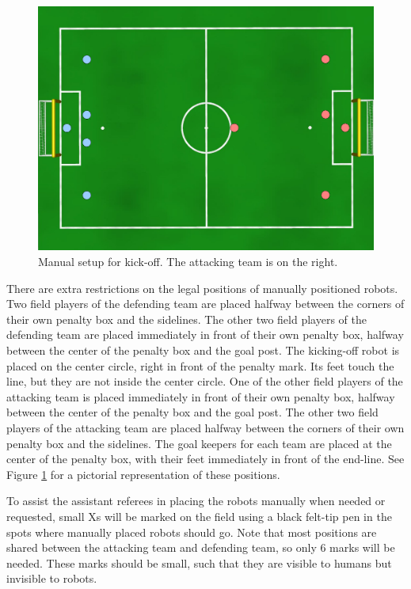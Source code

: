 \documentclass[12pt]{article}
\begin{document}
\begin{figure}[t]
\centerline{\includegraphics[width=\columnwidth]{figs/manual_placement_2014.pdf}}
\caption{Manual setup for kick-off.  The attacking team is on the right.}
\label{fig:ko}
\end{figure}

There are extra restrictions on the legal positions of manually positioned robots. Two field players of the defending team are placed halfway between the corners of their own penalty box and the sidelines. The other two field players of the defending team are placed immediately in front of their own penalty box, halfway between the center of the penalty box and the goal post.  The kicking-off robot is placed on the center circle, right in front of the penalty mark. Its feet touch the line, but they are not inside the center circle. 
One of the other field players of the attacking team is placed immediately in front of their own penalty box, halfway between the center of the penalty box and the goal post. The other two field players of the attacking team are placed halfway between the corners of their own penalty box and the sidelines. 
  The goal keepers for each team are placed at the center of the penalty box, with their feet immediately in front of the end-line. See Figure \ref{fig:ko} for a pictorial representation of these positions.

To assist the assistant referees in placing the robots manually when needed or requested, small Xs will be marked on the field using a black felt-tip pen in the spots where manually placed robots should go.  Note that most positions are shared between the attacking team and defending team, so only 6 marks will be needed.  These marks should be small, such that they are visible to humans but invisible to robots.
\end{document}
